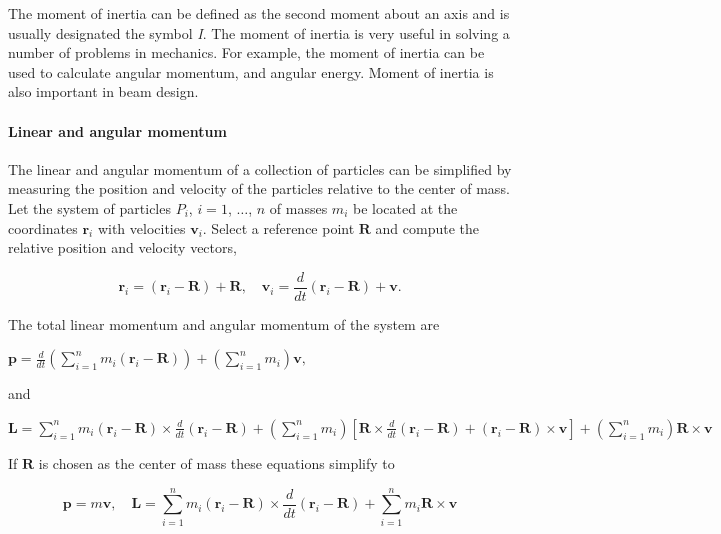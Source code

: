 The moment of inertia can be defined as the second moment about an axis and is usually designated the symbol \textit{I}. The moment of inertia is very useful in solving a number of problems in mechanics. For example, the moment of inertia can be used to calculate angular momentum, and angular energy. Moment of inertia is also important in beam design.



\paragraph{Linear and angular momentum}



The linear and angular momentum of a collection of particles can be simplified by measuring the position and velocity of the particles relative to the center of mass. Let the system of particles $P _i$, $i=1$, $\dots$, $n$ of masses $m _i$ be located at the coordinates $\mathbf{r} _i$ with velocities $\mathbf{v} _i$. Select a reference point $\mathbf{R}$ and compute the relative position and velocity vectors,



$$\mathbf{r} _i = (\mathbf{r} _i - \mathbf{R}) + \mathbf{R}, \quad \mathbf{v} _i = \frac{d}{dt}(\mathbf{r} _i - \mathbf{R}) + \mathbf{v}.$$



The total linear momentum and angular momentum of the system are



$\mathbf{p} = \frac{d}{dt}\left(\sum _{i=1}^n m _i (\mathbf{r} _i - \mathbf{R})\right) + \left(\sum _{i=1}^n m _i\right) \mathbf{v},$



and



$\mathbf{L} = \sum _{i=1}^n m _i (\mathbf{r} _i - \mathbf{R}) \times \frac{d}{dt}(\mathbf{r} _i - \mathbf{R}) + \left(\sum _{i=1}^n m _i \right) \left[\mathbf{R} \times \frac{d}{dt}(\mathbf{r} _i - \mathbf{R}) + (\mathbf{r} _i - \mathbf{R}) \times \mathbf{v} \right] + \left(\sum _{i=1}^n m _i \right)\mathbf{R} \times \mathbf{v}$



If $\mathbf{R}$ is chosen as the center of mass these equations simplify to



$$\mathbf{p} = m\mathbf{v},\quad \mathbf{L} = \sum _{i=1}^n m _i (\mathbf{r} _i - \mathbf{R}) \times \frac{d}{dt}(\mathbf{r} _i - \mathbf{R}) + \sum _{i=1}^n m _i \mathbf{R} \times \mathbf{v}$$

